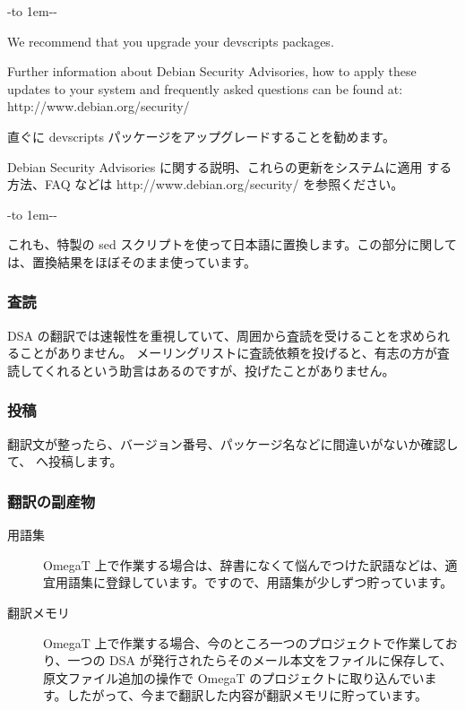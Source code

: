 \documentclass[mingoth,a4paper]{jsarticle}
\begin{document}
-\leaders\hbox to 1em{\hss{}-\hss}\hfill -\par
\parbox[t]{0.47\linewidth}{
We recommend that you upgrade your devscripts packages.

Further information about Debian Security Advisories, how to apply
these updates to your system and frequently asked questions can be
found at: http://www.debian.org/security/
}\hfil \vrule \hfil
\parbox[t]{0.48\linewidth}{
直ぐに devscripts パッケージをアップグレードすることを勧めます。

Debian Security Advisories に関する説明、これらの更新をシステムに適用
する方法、FAQ などは http://www.debian.org/security/ を参照ください。
}\hfil

-\leaders\hbox to 1em{\hss{}-\hss}\hfill -\par

\vspace{1ex}\par

これも、特製の sed スクリプトを使って日本語に置換します。この部分に関しては、置換結果をほぼそのまま使っています。

\subsubsection{査読}

DSA の翻訳では速報性を重視していて、周囲から査読を受けることを求められることがありません。
 メーリングリストに査読依頼を投げると、有志の方が査読してくれるという助言はあるのですが、投げたことがありません。

\subsubsection{投稿}

翻訳文が整ったら、バージョン番号、パッケージ名などに間違いがないか確認して、  へ投稿します。


\subsubsection{翻訳の副産物}

\begin{description}
\item[用語集] OmegaT 上で作業する場合は、辞書になくて悩んでつけた訳語などは、適宜用語集に登録しています。ですので、用語集が少しずつ貯っています。
\item[翻訳メモリ] OmegaT 上で作業する場合、今のところ一つのプロジェクトで作業しており、一つの DSA が発行されたらそのメール本文をファイルに保存して、原文ファイル追加の操作で OmegaT のプロジェクトに取り込んでいます。したがって、今まで翻訳した内容が翻訳メモリに貯っています。
\end{description}
\end{document}
